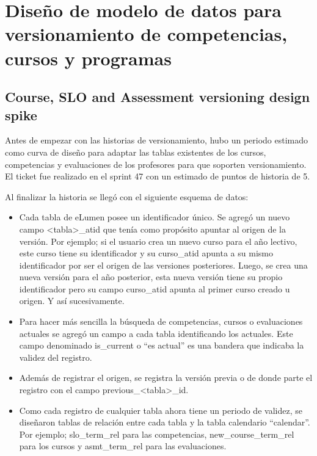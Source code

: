 \section{Diseño de modelo de datos para versionamiento de competencias, cursos y programas}
\subsection{Course, SLO and Assessment versioning design spike}
Antes de empezar con las historias de versionamiento, hubo un periodo estimado como curva de diseño para adaptar las tablas existentes de los cursos, competencias y evaluaciones de los profesores para que soporten versionamiento. El ticket fue realizado en el sprint 47 con un estimado de puntos de historia de 5.

Al finalizar la historia se llegó con el siguiente esquema de datos:
\begin{itemize}
	\item Cada tabla de eLumen posee un identificador único. Se agregó un nuevo campo <tabla>_atid que tenía como propósito apuntar al origen de la versión. Por ejemplo; si el usuario crea un nuevo curso para el año lectivo, este curso tiene su identificador y su curso_atid apunta a su mismo identificador por ser el origen de las versiones posteriores. Luego, se crea una nueva versión para el año posterior, esta nueva versión tiene su propio identificador pero su campo curso_atid apunta al primer curso creado u origen. Y así sucesivamente.
	\item Para hacer más sencilla la búsqueda de competencias, cursos o evaluaciones actuales se agregó un campo a cada tabla identificando los actuales. Este campo denominado is_current o “es actual” es una bandera que indicaba la validez del registro.
	\item Además de registrar el origen, se registra la versión previa o de donde parte el registro con el campo previous_<tabla>_id.
	\item Como cada registro de cualquier tabla ahora tiene un periodo de validez, se diseñaron tablas de relación entre cada tabla y la tabla calendario “calendar”. Por ejemplo; slo_term_rel para las competencias, new_course_term_rel para los cursos y asmt_term_rel para las evaluaciones.
\end{itemize}